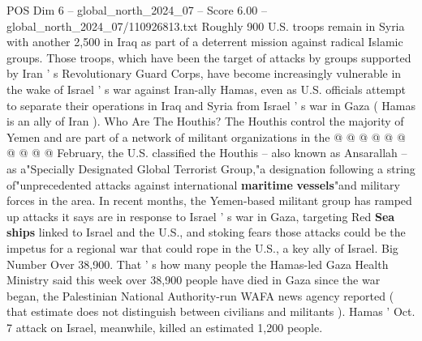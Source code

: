 \begin{textsample}{POS Dim 6 – global\_north\_2024\_07 – Score 6.00 – global\_north\_2024\_07/110926813.txt}
Roughly 900 U.S. troops remain in Syria with another 2,500 in Iraq as part of a deterrent mission against radical Islamic groups.
Those troops, which have been the target of attacks by groups supported by Iran ' s Revolutionary Guard Corps, have become increasingly vulnerable in the wake of Israel ' s war against Iran-ally Hamas, even as U.S. officials attempt to separate their operations in Iraq and Syria from Israel ' s war in Gaza ( Hamas is an ally of Iran ).
Who Are The Houthis?
The Houthis control the majority of Yemen and are part of a network of militant organizations in the @ @ @ @ @ @ @ @ @ @ February, the U.S. classified the Houthis -- also known as Ansarallah -- as a"Specially Designated Global Terrorist Group,"a designation following a string of"unprecedented attacks against international \textbf{maritime} \textbf{vessels}"and military forces in the area.
In recent months, the Yemen-based militant group has ramped up attacks it says are in response to Israel ' s war in Gaza, targeting Red \textbf{Sea} \textbf{ships} linked to Israel and the U.S., and stoking fears those attacks could be the impetus for a regional war that could rope in the U.S., a key ally of Israel.
Big Number Over 38,900.
That ' s how many people the Hamas-led Gaza Health Ministry said this week over 38,900 people have died in Gaza since the war began, the Palestinian National Authority-run WAFA news agency reported ( that estimate does not distinguish between civilians and militants ).
Hamas ' Oct. 7 attack on Israel, meanwhile, killed an estimated 1,200 people.

\end{textsample}

